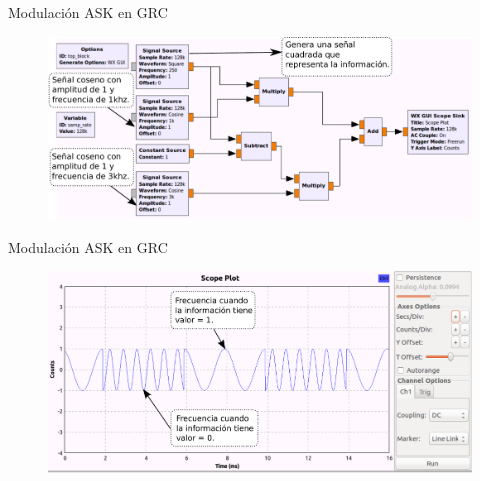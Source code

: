 \begin{frame}{Modulación ASK en GRC}
\begin{figure}[H]
\centering
\includegraphics[width=\textwidth]{parte1/lab4/pdf/lab4_5.pdf}
\end{figure}
\end{frame}

\begin{frame}{Modulación ASK en GRC}
\begin{figure}[H]
\centering
\includegraphics[width=\textwidth]{parte1/lab4/pdf/lab4_6.pdf}
\end{figure}
\end{frame}

